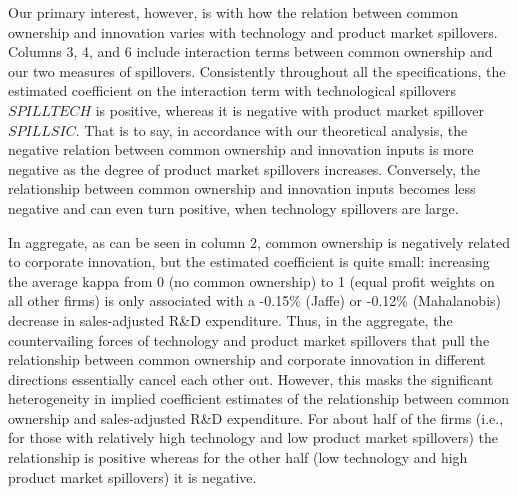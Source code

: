 \documentclass[12pt]{article}
\begin{document}
Our primary interest, however, is with how the relation between common ownership and innovation varies with technology and product market spillovers. Columns 3, 4, and 6 include interaction terms between common ownership and our two measures of spillovers. Consistently throughout all the specifications, the estimated coefficient on the interaction term with technological spillovers $\mathit{SPILLTECH}$ is positive, whereas it is negative with product market spillover $\mathit{SPILLSIC}$. That is to say, in accordance with our theoretical analysis, the negative relation between common ownership and innovation inputs is more negative as the degree of product market spillovers increases. Conversely, the relationship between common ownership and innovation inputs becomes less negative and can even turn positive, when technology spillovers are large.

In aggregate, as can be seen in column 2, common ownership is negatively related to corporate innovation, but the estimated coefficient is quite small: increasing the average kappa from 0 (no common ownership) to 1 (equal profit weights on all other firms) is only associated with a -0.15\% (Jaffe) or -0.12\% (Mahalanobis) decrease in sales-adjusted R\&D expenditure. Thus, in the aggregate, the countervailing forces of technology and product market spillovers that pull the relationship between common ownership and corporate innovation in different directions essentially cancel each other out. However, this masks the significant heterogeneity in implied coefficient estimates of the relationship between common ownership and sales-adjusted R\&D expenditure. For about half of the firms (i.e., for those with relatively high technology and low product market spillovers) the relationship is positive whereas for the other half (low technology and high product market spillovers) it is negative.
\end{document}

